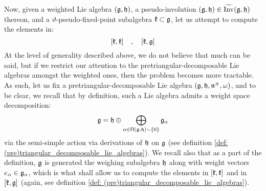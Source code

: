         Now, given a weighted Lie algebra $(\mathfrak{g}, \mathfrak{h})$, a pseudo-involution $(\mathfrak{g}, \mathfrak{h}) \in \widetilde{\operatorname{Inv}}(\mathfrak{g}, \mathfrak{h})$ thereon, and a $\vartheta$-pseudo-fixed-point subalgebra $\mathfrak{k} \subset \mathfrak{g}$, let us attempt to compute the elements in:
            $$[\mathfrak{k}, \mathfrak{k}] \quad, \quad [\mathfrak{k}, \mathfrak{g}]$$
        At the level of generality described above, we do not believe that much can be said, but if we restrict our attention to the pretriangular-decomposable Lie algebras amongst the weighted ones, then the problem becomes more tractable. As such, let us fix a pretriangular-decomposable Lie algebra $(\mathfrak{g}, \mathfrak{h}, \mathfrak{n}^{\pm}, \omega)$, and to be clear, we recall that by definition, such a Lie algebra admits a weight space decomposition:
            $$\mathfrak{g} = \mathfrak{h} \oplus \bigoplus_{\alpha \in \mathsf{\Pi}(\mathfrak{g}, \mathfrak{h}) \smallsetminus \{0\}} \mathfrak{g}_{\alpha}$$
        via the semi-simple action via derivations of $\mathfrak{h}$ on $\mathfrak{g}$ (see definition \ref{def: (pre)triangular_decomposable_lie_algebras}). We recall also that as a part of the definition, $\mathfrak{g}$ is generated the weighing subalgebra $\mathfrak{h}$ along with weight vectors $e_{\alpha} \in \mathfrak{g}_{\alpha}$, which is what shall allow us to compute the elements in $[\mathfrak{k}, \mathfrak{k}]$ and in $[\mathfrak{k}, \mathfrak{g}]$ (again, see definition \ref{def: (pre)triangular_decomposable_lie_algebras}).
